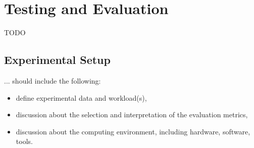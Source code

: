 \chapter{Testing and Evaluation\label{cha:chapter5}}

TODO


\section{Experimental Setup\label{sec:exp}}
... should include the following:
\begin{itemize}

\item define experimental data and workload(s),
\item discussion about the selection and interpretation of the evaluation metrics,
\item discussion about the computing environment, including hardware, software, tools.
\end{itemize}

\begingroup
\renewcommand\thesection{5.X}



